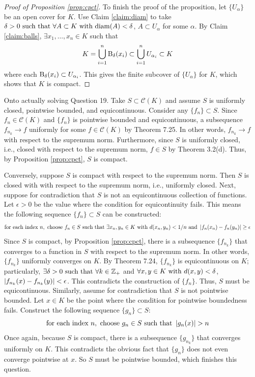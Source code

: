 \documentclass[12pt]{article}
\begin{document}
\begin{proof}[Proof of Proposition \ref{prop:cpct}]
  To finish the proof of the proposition, let $\{U_\alpha\}$ be an open cover for $K$. 
  Use Claim \ref{claim:diam} to take $\delta > 0 \text{ such that } \forall A \subset K \text{ with } \text{diam}(A) < \delta$, $A \subset U_\alpha$ for some $\alpha$. 
  By Claim \ref{claim:balls}, $\exists x_1, \ldots, x_n \in K$ such that 
  $$K = \bigcup_{i = 1}^{n} \text{B}_{\delta}(x_i) \subset \bigcup_{i = 1}^{n} U_{\alpha_i} \subset K$$ 
  where each $\text{B}_{\delta}(x_i) \subset U_{\alpha_i}$. 
  This gives the finite subcover of $\{U_\alpha\}$ for $K$, which shows that $K$ is compact. 
\end{proof}

Onto actually solving Question 19. 
Take $S \subset \mathscr{C}(K)$ and assume $S$ is uniformly closed, pointwise bounded, and equicontinuous. 
Consider any $\{f_n\} \subset S$. 
Since $f_n \in \mathscr{C}(K)$ and $\{f_n\}$ is pointwise bounded and equicontinuous, a subsequence $f_{n_k} \rightarrow f$ uniformly for some $f \in \mathscr{C}(K)$ by Theorem 7.25. 
In other words, $f_{n_k} \rightarrow f$ with respect to the supremum norm. 
Furthermore, since $S$ is uniformly closed, i.e., closed with respect to the supremum norm, $f \in S$ by Theorem 3.2(d). 
Thus, by Proposition \ref{prop:cpct}, $S$ is compact. 

Conversely, suppose $S$ is compact with respect to the supremum norm.  
Then $S$ is closed with with respect to the supremum norm, i.e., uniformly closed. 
Next, suppose for contradiction that $S$ is not an equicontinuous collection of functions. 
Let $\epsilon > 0$ be the value where the condition for equicontinuity fails. 
This means the following sequence $\{f_n\} \subset S$ can be constructed: 
$$\text{for each index } n, \text{ choose } f_n \in S \text{ such that } \exists x_n, y_n \in K \text{ with } d(x_n, y_n) < 1/n \text{ and } \left|f_n(x_n) - f_n(y_n)\right| \geq \epsilon$$ 
Since $S$ is compact, by Proposition \ref{prop:cpct}, there is a subsequence $\{f_{n_k}\}$ that converges to a function in $S$ with respect to the supremum norm.
In other words, $\{f_{n_k}\}$ uniformly converges on $K$. 
By Theorem 7.24, $\{f_{n_k}\}$ is equicontinuous on $K$; 
particularly, $\exists \delta > 0 \text{ such that } \forall k \in \mathbb{Z}_{+}$ and $\forall x, y \in K \text{ with } d(x, y) < \delta$, $\left|f_{n_k}(x) - f_{n_k}(y)\right| < \epsilon$. 
This contradicts the construction of $\{f_n\}$. 
Thus, $S$ must be equicontinuous. 
Similarly, assume for contradiction that $S$ is not pointwise bounded. 
Let $x \in K$ be the point where the condition for pointwise boundedness fails. 
Construct the following sequence $\{g_n\} \subset S$: 
$$\text{for each index } n, \text{ choose } g_n \in S \text{ such that } \left|g_n(x)\right| > n$$  
Once again, because $S$ is compact, there is a subsequence $\{g_{n_k}\}$ that converges uniformly on $K$. 
This contradicts the obvious fact that $\{g_n\}$ does not even converge pointwise at $x$. 
So $S$ must be pointwise bounded, which finishes this question. 
\end{document}
